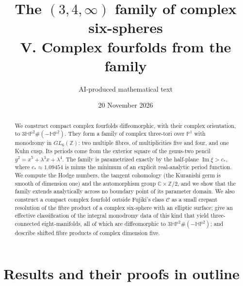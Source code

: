 
\title{The $(3,4,\infty)$ family of complex six-spheres\\[.5em]V. Complex fourfolds from the family}
\author{AI-produced mathematical text}
\date{20 November 2026}
\maketitle
\begin{abstract}
We construct compact complex fourfolds diffeomorphic, with their complex
orientation, to $3\mathbb{HP}^2\#(-\mathbb{HP}^2)$.
They form a family of complex three-tori over $\mathbb P^1$ with
monodromy in $GL_6(\mathbb Z)$: two multiple fibres, of multiplicities
five and four, and one Kuhn cusp. Its periods come from the exterior
square of the genus-two pencil $y^2=x^5+\lambda^3x+\lambda^4$.
The family is parametrized exactly
by the half-plane $\operatorname{Im}\xi>c_*$, where
$c_*\approx1.09454$ is minus the minimum of an explicit real-analytic
period function.  We compute the Hodge numbers, the tangent
cohomology (the Kuranishi germ is smooth of dimension one) and the
automorphism group $\mathbb C\times\mathbb Z/2$, and we show that the
family extends analytically across no boundary point of its parameter
domain.  We also construct a compact complex fourfold outside Fujiki's
class $\mathcal C$ as a small crepant resolution of the fibre product of
a complex six-sphere with an elliptic surface; give an effective
classification of the integral monodromy data of this kind that yield
three-connected eight-manifolds, all of which are diffeomorphic to
$3\mathbb{HP}^2\#(-\mathbb{HP}^2)$; and describe shifted fibre products
of complex dimension five.
\end{abstract}
\clearpage
\tableofcontents
\clearpage
\section{Results and their proofs in outline}\label{sec:results}
